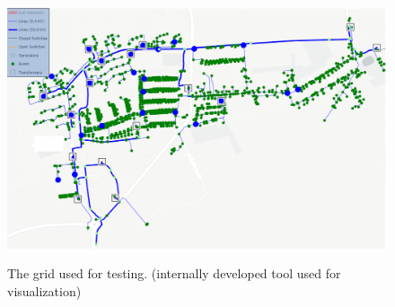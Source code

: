 \begin{figure}[h]
	\begin{centering}
		{\includegraphics[scale=0.5]{figures/experiments/enwg_mixed.png}}
		\caption[Example grid]{The grid used for testing. (internally developed tool used for visualization)}
		\label{fig:enwg_mixed}
	\end{centering}
\end{figure}
